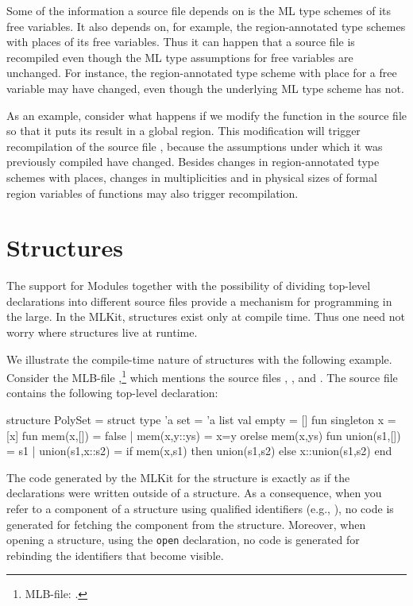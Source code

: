 \documentclass[12pt]{book}
\begin{document}
Some of the information a source file depends on is the ML type schemes of its
free variables. It also depends on, for example, the region-annotated type
schemes with places of its free variables.  Thus it can happen that a source
file is recompiled even though the ML type assumptions for free variables are
unchanged. For instance, the region-annotated type scheme with place for a free
variable may have changed, even though the underlying ML type scheme has not.

As an example, consider what happens if we modify the function  in
the source file  so that it puts its result in a global region. This
modification will trigger recompilation of the source file ,
because the assumptions under which it was previously compiled have changed.
Besides changes in region-annotated type schemes with places, changes in
multiplicities and in physical sizes of formal region variables of functions may
also trigger recompilation.


\section{Structures}

The support for Modules together with the possibility of dividing top-level
declarations into different source files provide a mechanism for programming in
the large. In the MLKit, structures exist only at compile time.  Thus one need
not worry where
%
%
%
structures live at runtime.

We illustrate the compile-time nature of structures with the following
example. Consider the MLB-file ,\footnote{MLB-file:
.} which mentions the source files ,
, and . The source file 
contains the following top-level declaration:
\begin{smlcode}
  structure PolySet =
    struct
      type 'a set = 'a list
      val empty = []
      fun singleton x = [x]
      fun mem(x,[]) = false
        | mem(x,y::ys) = x=y orelse mem(x,ys)
      fun union(s1,[]) = s1
        | union(s1,x::s2) = if mem(x,s1) then union(s1,s2)
                            else x::union(s1,s2)
    end
\end{smlcode}
The code generated by the MLKit for the  structure is exactly as if
the declarations were written outside of a structure.  As a consequence, when
you refer to a component of a structure using qualified identifiers (e.g.,
), no code is generated for fetching the component from the
structure. Moreover, when opening a structure, using the
%
%
%
\lstinline{open} declaration, no code is generated for rebinding the identifiers
that become visible.
\end{document}
